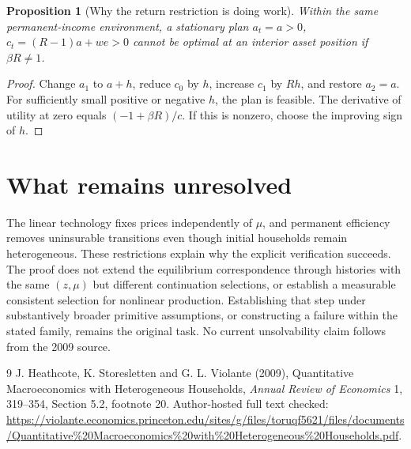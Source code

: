 \documentclass[11pt]{article}
\newtheorem{proposition}{Proposition}
\theoremstyle{definition}
\begin{document}
\begin{proposition}[Why the return restriction is doing work]
Within the same permanent-income environment, a stationary plan $a_t=a>0$, $c_t=(R-1)a+we>0$ cannot be optimal at an interior asset position if $\beta R\ne1$.
\end{proposition}
\begin{proof}
Change $a_1$ to $a+h$, reduce $c_0$ by $h$, increase $c_1$ by $Rh$, and restore $a_2=a$. For sufficiently small positive or negative $h$, the plan is feasible. The derivative of utility at zero equals $(-1+\beta R)/c$. If this is nonzero, choose the improving sign of $h$.
\end{proof}

\section*{What remains unresolved}
The linear technology fixes prices independently of $\mu$, and permanent efficiency removes uninsurable transitions even though initial households remain heterogeneous. These restrictions explain why the explicit verification succeeds. The proof does not extend the equilibrium correspondence through histories with the same $(z,\mu)$ but different continuation selections, or establish a measurable consistent selection for nonlinear production. Establishing that step under substantively broader primitive assumptions, or constructing a failure within the stated family, remains the original task. No current unsolvability claim follows from the 2009 source.
\begin{thebibliography}{9}
 J. Heathcote, K. Storesletten and G. L. Violante (2009), Quantitative Macroeconomics with Heterogeneous Households, \emph{Annual Review of Economics} 1, 319--354, Section 5.2, footnote 20. Author-hosted full text checked: \url{https://violante.economics.princeton.edu/sites/g/files/toruqf5621/files/documents/Quantitative\%20Macroeconomics\%20with\%20Heterogeneous\%20Households.pdf}.
\end{thebibliography}
\end{document}
